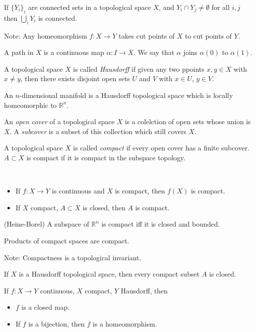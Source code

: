 \begin{thm}
If $\{Y_{i}\}_{i}$ are connected sets in a topological space $X$,
and $Y_{i}\cap Y_{j}\neq\emptyset$ for all $i,j$ then $\bigcup_{i}Y_{i}$
is connected.

Note: Any homeomorphism $f:X\to Y$ takes cut points of $X$ to cut
points of $Y$.
\end{thm}

\begin{defn}
A path in $X$ is a continuous map $\alpha:I\to X$. We say that $\alpha$
joins $\alpha(0)$ to $\alpha(1)$.
\end{defn}

\begin{defn}
A topological space $X$ is called \emph{Hausdorff} if given any two
ppoints $x,y\in X$ with $x\neq y$, then there exists disjoint open
sets $U$ and $V$ with $x\in U$, $y\in V$.
\end{defn}

\begin{defn}
An $n$-dimensional manifold is a Hausdorff topological space which
is locally homeomorphic to $\mathbb{R}^{n}$.
\end{defn}

\begin{defn}
An \emph{open cover} of a topological space $X$ is a colelction of
open sets whose union is $X$. A \emph{subcover} is a subset of this
collection which still covers $X$.

A topological space $X$ is called \emph{compact }if every open cover
has a finite subcover. $A\subset X$ is compact if it is compact in
the subspace topology.\end{defn}
\begin{thm}
~\end{thm}
\begin{itemize}
\item If $f:X\to Y$ is continuous and $X$ is compact, then $f(X)$ is
compact.
\item If $X$ compact, $A\subset X$ is closed, then $A$ is compact.\end{itemize}
\begin{thm}
(Heine-Borel) A subspace of $\mathbb{R}^{n}$ is compact iff it is
closed and bounded.
\end{thm}

\begin{thm}
Products of compact spaces are compact.
\end{thm}


Note: Compactness is a topological invariant.


\begin{thm}
If $X$ is a Hausdorff topological space, then every compact subset
$A$ is closed.
\end{thm}

\begin{thm}
If $f:X\to Y$ continuous, $X$ compact, $Y$ Hausdorff, then\end{thm}
\begin{itemize}
\item $f$ is a closed map.
\item If $f$ is a bijection, then $f$ is a homeomorphism.
\end{itemize}
